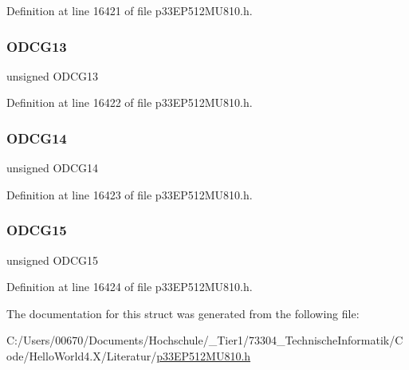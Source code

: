 Definition at line 16421 of file p33\+E\+P512\+M\+U810.\+h.

\mbox{\label{structtag_o_d_c_g_b_i_t_s_a0b99aa6428aaf64cd07563994d226a4a}} 
\subsubsection{\texorpdfstring{O\+D\+C\+G13}{ODCG13}}
{\footnotesize\ttfamily unsigned O\+D\+C\+G13}



Definition at line 16422 of file p33\+E\+P512\+M\+U810.\+h.

\mbox{\label{structtag_o_d_c_g_b_i_t_s_ae10c223139b87c2d5ef8edc93bf8bcd4}} 
\subsubsection{\texorpdfstring{O\+D\+C\+G14}{ODCG14}}
{\footnotesize\ttfamily unsigned O\+D\+C\+G14}



Definition at line 16423 of file p33\+E\+P512\+M\+U810.\+h.

\mbox{\label{structtag_o_d_c_g_b_i_t_s_a507b910337e81beaa9773d2cdaa08ec8}} 
\subsubsection{\texorpdfstring{O\+D\+C\+G15}{ODCG15}}
{\footnotesize\ttfamily unsigned O\+D\+C\+G15}



Definition at line 16424 of file p33\+E\+P512\+M\+U810.\+h.



The documentation for this struct was generated from the following file\+:\begin{DoxyCompactItemize}
\item 
C\+:/\+Users/00670/\+Documents/\+Hochschule/\+\_\+\+Tier1/73304\+\_\+\+Technische\+Informatik/\+Code/\+Hello\+World4.\+X/\+Literatur/\hyperlink{p33_e_p512_m_u810_8h}{p33\+E\+P512\+M\+U810.\+h}\end{DoxyCompactItemize}
